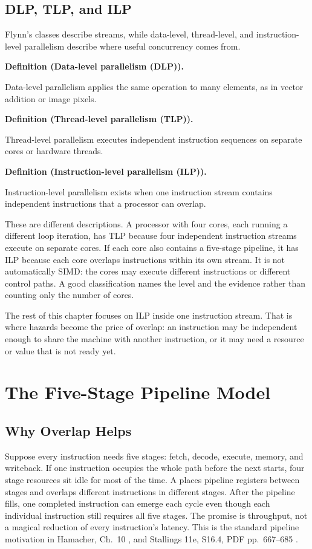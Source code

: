 \documentclass[11pt]{article}
\newenvironment{definitionbox}[1]{%
  \par\noindent\textbf{Definition (#1).}\ \itshape
}{\par\vspace{0.3em}}
\begin{document}
\subsection{DLP, TLP, and ILP}

Flynn's classes describe streams, while data-level, thread-level, and
instruction-level parallelism describe where useful concurrency comes from.
\begin{definitionbox}{Data-level parallelism (DLP)}
Data-level parallelism applies the same operation to many elements, as in
vector addition or image pixels.
\end{definitionbox}
\begin{definitionbox}{Thread-level parallelism (TLP)}
Thread-level parallelism executes independent instruction sequences on
separate cores or hardware threads.
\end{definitionbox}
\begin{definitionbox}{Instruction-level parallelism (ILP)}
Instruction-level parallelism exists when one instruction stream contains
independent instructions that a processor can overlap.
\end{definitionbox}

These are different descriptions. A processor with four cores, each running a
different loop iteration, has TLP because four independent instruction
streams execute on separate cores. If each core also contains a five-stage
pipeline, it has ILP because each core overlaps instructions within its own
stream. It is not automatically SIMD: the cores may execute different
instructions or different control paths. A good classification names the
level and the evidence rather than counting only the number of cores.

The rest of this chapter focuses on ILP inside one instruction stream. That is
where hazards become the price of overlap: an instruction may be independent
enough to share the machine with another instruction, or it may need a
resource or value that is not ready yet.

\section{The Five-Stage Pipeline Model}
\label{sec:pipeline}

\subsection{Why Overlap Helps}

Suppose every instruction needs five stages: fetch, decode, execute, memory,
and writeback. If one instruction occupies the whole path before the next
starts, four stage resources sit idle for most of the time. A 
places pipeline registers between stages and overlaps different instructions
in different stages. After the pipeline fills, one completed instruction can
emerge each cycle even though each individual instruction still requires all
five stages. The promise is throughput, not a magical reduction of every
instruction's latency. This is the standard pipeline motivation in Hamacher,
Ch.~10 \cite{Hamacher2002_computer_organization}, and Stallings 11e, S16.4,
PDF pp.~667--685 \cite{Stallings2015_computer_organization}.
\end{document}
